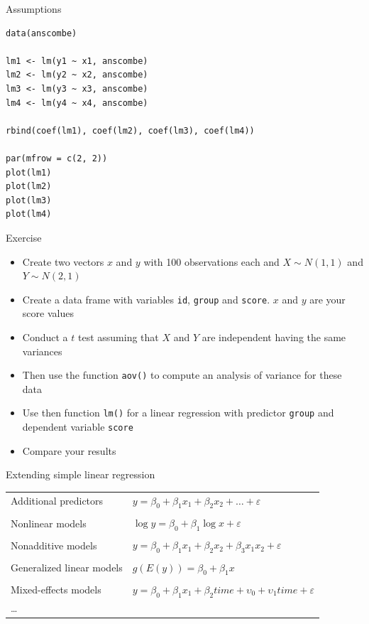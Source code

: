 \documentclass[aspectratio=169]{beamer}
\begin{document}
\begin{frame}[fragile]{Assumptions}
\begin{lstlisting}
data(anscombe)

lm1 <- lm(y1 ~ x1, anscombe)
lm2 <- lm(y2 ~ x2, anscombe)
lm3 <- lm(y3 ~ x3, anscombe)
lm4 <- lm(y4 ~ x4, anscombe)

rbind(coef(lm1), coef(lm2), coef(lm3), coef(lm4))

par(mfrow = c(2, 2))
plot(lm1)
plot(lm2)
plot(lm3)
plot(lm4)
\end{lstlisting}
\end{frame}

\begin{frame}{}
  \begin{block}{Exercise}
    \begin{itemize}
      \item Create two vectors $x$ and $y$ with 100 observations each and
        $X \sim N(1,1)$ and $Y \sim N(2,1)$
      \item Create a data frame with variables \texttt{id}, \texttt{group}
        and \texttt{score}. $x$ and $y$ are your score values
      \item Conduct a $t$ test assuming that $X$ and $Y$ are independent
        having the same variances
      \item Then use the function \texttt{aov()} to compute an analysis of
        variance for these data
      \item Use then function \texttt{lm()} for a linear regression with
        predictor \texttt{group} and dependent variable \texttt{score}
      \item Compare your results
    \end{itemize}
  \end{block}
\end{frame}

\begin{frame}{Extending simple linear regression}
  \begin{tabular}{ll}
    Additional predictors &
      $y = \beta_0 + \beta_1 x_1 + \beta_2 x_2 + \dots +
      \varepsilon$\\
      & \\
    Nonlinear models &
      $\log y = \beta_0 + \beta_1 \log x + \varepsilon$\\
      & \\
    Nonadditive models &
      $y = \beta_0 + \beta_1 x_1 + \beta_2 x_2 + \beta_3
      x_1 x_2 + \varepsilon$\\
      & \\
    Generalized linear models &
      $g(E(y)) = \beta_0 + \beta_1 x$\\
      & \\
    Mixed-effects models &
      $y = \beta_0 + \beta_1 x_1 + \beta_2 time + 
      \upsilon_0 + \upsilon_1 time + \varepsilon$\\
      \dots & \\
  \end{tabular}
\end{frame}
\end{document}
